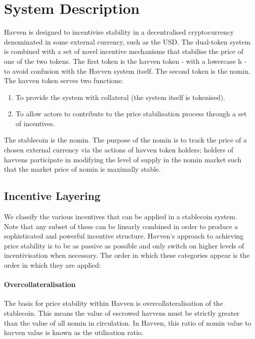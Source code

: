 \section{System Description} Havven is designed to incentivise stability in a decentralised cryptocurrency denominated in some external currency, such as the USD. The dual-token system is combined with a set of novel incentive mechanisms that stabilise the price of one of the two tokens. The first token is the havven token - with a lowercase h - to avoid confusion with the Havven system itself. The second token is the nomin. \\

\noindent The havven token serves two functions:

\begin{enumerate}
\item{To provide the system with collateral (the system itself is tokenised).}
\item{To allow actors to contribute to the price stabilisation process through a set of incentives.}
\end{enumerate}

\noindent The stablecoin is the nomin. The purpose of the nomin is to track the price of a chosen external currency via the actions of havven token holders; holders of havvens participate in modifying the level of supply in the nomin market such that the market price of nomin is maximally stable.

\subsection{Incentive Layering}

We classify the various incentives that can be applied in a stablecoin system. Note that any subset of these can be linearly combined in order to produce a sophisticated and powerful incentive structure. Havven's approach to achieving price stability is to be as passive as possible and only switch on higher levels of incentivisation when necessary. The order in which these categories appear is the order in which they are applied:

\paragraph{Overcollateralisation}

The basis for price stability within Havven is overcollateralisation of the stablecoin. This means the value of escrowed havvens must be strictly greater than the value of all nomin in circulation. In Havven, this ratio of nomin value to havven value is known as the utilisation ratio.


